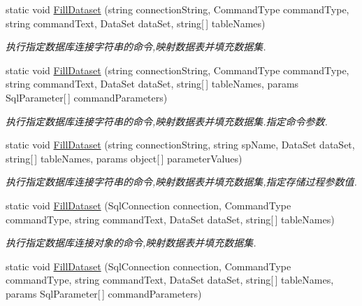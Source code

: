 \begin{DoxyCompactItemize}
static void \hyperlink{class_x_c_l_net_tools_1_1_data_base_1_1_m_s_s_q_l_1_1_sql_helper_a38fc54ab85679d2029119d894bdcdc42}{Fill\+Dataset} (string connection\+String, Command\+Type command\+Type, string command\+Text, Data\+Set data\+Set, string\mbox{[}$\,$\mbox{]} table\+Names)
\begin{DoxyCompactList}\small\item\em 执行指定数据库连接字符串的命令,映射数据表并填充数据集. \end{DoxyCompactList}\item 
static void \hyperlink{class_x_c_l_net_tools_1_1_data_base_1_1_m_s_s_q_l_1_1_sql_helper_ac7eefd77457caef01af061870b7da597}{Fill\+Dataset} (string connection\+String, Command\+Type command\+Type, string command\+Text, Data\+Set data\+Set, string\mbox{[}$\,$\mbox{]} table\+Names, params Sql\+Parameter\mbox{[}$\,$\mbox{]} command\+Parameters)
\begin{DoxyCompactList}\small\item\em 执行指定数据库连接字符串的命令,映射数据表并填充数据集.\+指定命令参数. \end{DoxyCompactList}\item 
static void \hyperlink{class_x_c_l_net_tools_1_1_data_base_1_1_m_s_s_q_l_1_1_sql_helper_a2688bea134b820ddaaa75df7d1f21a9b}{Fill\+Dataset} (string connection\+String, string sp\+Name, Data\+Set data\+Set, string\mbox{[}$\,$\mbox{]} table\+Names, params object\mbox{[}$\,$\mbox{]} parameter\+Values)
\begin{DoxyCompactList}\small\item\em 执行指定数据库连接字符串的命令,映射数据表并填充数据集,指定存储过程参数值. \end{DoxyCompactList}\item 
static void \hyperlink{class_x_c_l_net_tools_1_1_data_base_1_1_m_s_s_q_l_1_1_sql_helper_a5d6bc0465743a2e0e0a488cafebc9b81}{Fill\+Dataset} (Sql\+Connection connection, Command\+Type command\+Type, string command\+Text, Data\+Set data\+Set, string\mbox{[}$\,$\mbox{]} table\+Names)
\begin{DoxyCompactList}\small\item\em 执行指定数据库连接对象的命令,映射数据表并填充数据集. \end{DoxyCompactList}\item 
static void \hyperlink{class_x_c_l_net_tools_1_1_data_base_1_1_m_s_s_q_l_1_1_sql_helper_a0175af253c5eb7e42adc14742fa9798e}{Fill\+Dataset} (Sql\+Connection connection, Command\+Type command\+Type, string command\+Text, Data\+Set data\+Set, string\mbox{[}$\,$\mbox{]} table\+Names, params Sql\+Parameter\mbox{[}$\,$\mbox{]} command\+Parameters)

\end{DoxyCompactItemize}
